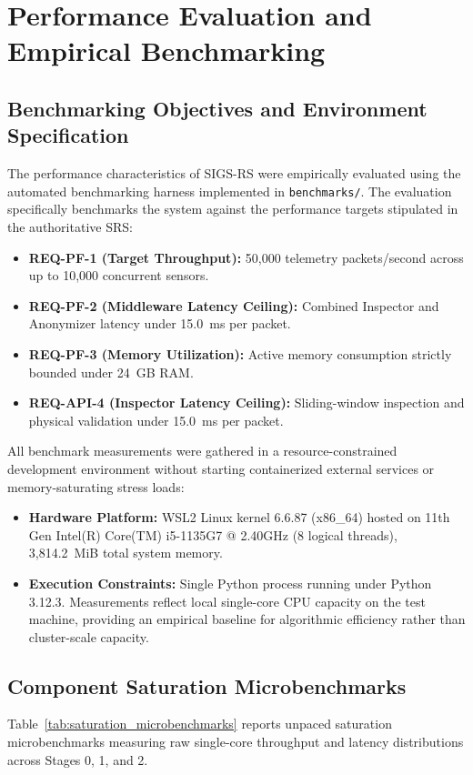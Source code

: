 \section{Performance Evaluation and Empirical Benchmarking}

\subsection{Benchmarking Objectives and Environment Specification}
The performance characteristics of SIGS-RS were empirically evaluated using the automated benchmarking harness implemented in \texttt{benchmarks/}. The evaluation specifically benchmarks the system against the performance targets stipulated in the authoritative SRS:
\begin{itemize}
    \item \textbf{REQ-PF-1 (Target Throughput):} 50,000 telemetry packets/second across up to 10,000 concurrent sensors.
    \item \textbf{REQ-PF-2 (Middleware Latency Ceiling):} Combined Inspector and Anonymizer latency under 15.0~ms per packet.
    \item \textbf{REQ-PF-3 (Memory Utilization):} Active memory consumption strictly bounded under 24~GB RAM.
    \item \textbf{REQ-API-4 (Inspector Latency Ceiling):} Sliding-window inspection and physical validation under 15.0~ms per packet.
\end{itemize}

All benchmark measurements were gathered in a resource-constrained development environment without starting containerized external services or memory-saturating stress loads:
\begin{itemize}
    \item \textbf{Hardware Platform:} WSL2 Linux kernel 6.6.87 (x86\_64) hosted on 11th Gen Intel(R) Core(TM) i5-1135G7 @ 2.40GHz (8 logical threads), 3,814.2~MiB total system memory.
    \item \textbf{Execution Constraints:} Single Python process running under Python 3.12.3. Measurements reflect local single-core CPU capacity on the test machine, providing an empirical baseline for algorithmic efficiency rather than cluster-scale capacity.
\end{itemize}

\subsection{Component Saturation Microbenchmarks}
Table~\ref{tab:saturation_microbenchmarks} reports unpaced saturation microbenchmarks measuring raw single-core throughput and latency distributions across Stages 0, 1, and 2.

